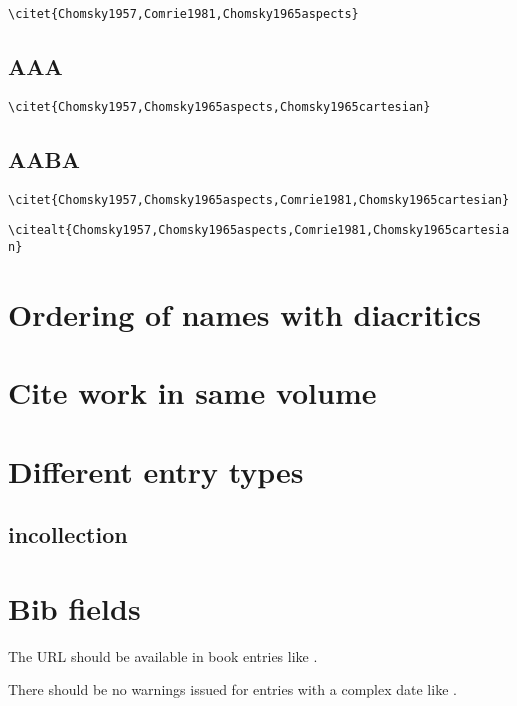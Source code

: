         \citet{Chomsky1957}            


\bigskip
\verb+\citet{Chomsky1957,Comrie1981,Chomsky1965aspects}+

       \citet{Chomsky1957,Comrie1981,Chomsky1965aspects} 

 
 
\subsection{AAA} 

\bigskip
\verb+\citet{Chomsky1957,Chomsky1965aspects,Chomsky1965cartesian}+

       \citet{Chomsky1957,Chomsky1965aspects,Chomsky1965cartesian} 
 
\subsection{AABA} 
\bigskip
\verb+\citet{Chomsky1957,Chomsky1965aspects,Comrie1981,Chomsky1965cartesian}+

       \citet{Chomsky1957,Chomsky1965aspects,Comrie1981,Chomsky1965cartesian} 
\bigskip
\verb+\citealt{Chomsky1957,Chomsky1965aspects,Comrie1981,Chomsky1965cartesian}+

       \citealt{Chomsky1957,Chomsky1965aspects,Comrie1981,Chomsky1965cartesian} 

 
\section{Ordering of names with diacritics} 
\citet{Circov1900,MeierCircovac1900}

\section{Cite work in same volume}




\section{Different entry types}
\subsection{incollection}
\citet{Meier2000}

\section{Bib fields}

The URL should be available in book entries like \citet{Url2001}.

There should be no warnings issued for entries with a complex date like \citet{ComplexYear2000}.